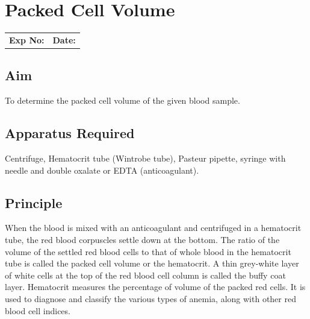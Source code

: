 \documentclass[a4paper,12pt,openany,twoside]{book}
\begin{document}
												\chapter*{\centering Packed Cell Volume}
												\begin{tabular}{p{5in} p{1in}}
													\textbf{Exp No:}  & \textbf{Date:}\\
												\end{tabular}

												\section*{Aim}

													To determine the packed cell volume of the given blood sample.
													\section*{Apparatus Required}
													Centrifuge, Hematocrit tube (Wintrobe tube), Pasteur pipette, syringe with needle and double oxalate or EDTA (anticoagulant).
													\section*{Principle}
													When the blood is mixed with an anticoagulant and centrifuged in a hematocrit tube, the red blood corpuscles settle down at the bottom. The ratio of the volume of the settled red blood cells to that of whole blood in the hematocrit tube is called the packed cell volume or the hematocrit. A thin grey-white layer of white cells at the top of the red blood cell column is called the buffy coat layer.
													Hematocrit measures the percentage of volume of the packed red cells. It is used to diagnose and classify the various types of anemia, along with other red blood cell indices.
\end{document}
